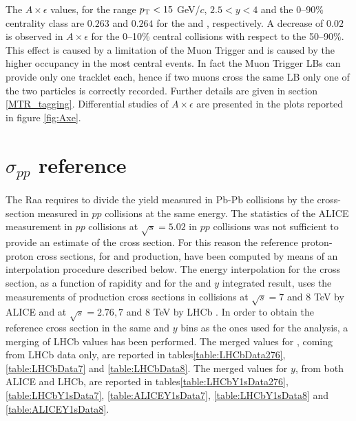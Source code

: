 The $A\times\epsilon$ values, for the range $p_{\rm T} < 15$ GeV/$c$, $2.5 < y < 4$ and the 0--90\% centrality class are $0.263$ and $0.264$ for the \upsis and \upsiss, respectively. 
A decrease of $0.02$ is observed in  $A\times\epsilon$ for the 0--10\% central collisions with respect to the 50--90\%. This effect is caused by a limitation of the Muon Trigger and is caused by the higher occupancy in the most central events.
In fact the Muon Trigger LBs can provide only one tracklet each, hence if two muons cross the same LB only one of the two particles is correctly recorded.
Further details are given in section \ref{MTR_tagging}.
Differential studies of $A\times\epsilon$ are presented in the plots reported in figure \ref{fig:Axe}.

\section{$\sigma_{pp}$ reference}
\label{sec:ppxsection}
The Raa requires to divide the yield measured in Pb-Pb collisions by the cross-section measured in $pp$ collisions at the same energy.
The statistics of the ALICE measurement in $pp$ collisions at $\sqrt{s}=5.02$ in $pp$ collisions was not sufficient to provide an estimate of the \upsi cross section.
For this reason the reference proton-proton cross sections, for \upsis and \upsiss production, have been computed by means of an interpolation procedure described below.
The energy interpolation for the \upsi cross section, as a function of rapidity and for the \pt and $y$ integrated result, uses the measurements of \upsi production cross sections in \pp collisions at $\sqrt{s}=7$ and $8$ \rm{TeV} by ALICE \cite{Abelev:2014qha,Adam:2015rta} and at $\sqrt{s}=2.76, 7$ and $8$ \rm{TeV} by LHCb \cite{Aaij:2014nwa,Aaij:2015awa}. 
In order to obtain the reference cross section in the same \pt and $y$ bins as the ones used for the analysis, a merging of LHCb values has been performed.
The merged values for \pt, coming from LHCb data only, are reported in tables\ref{table:LHCbData276}, \ref{table:LHCbData7} and \ref{table:LHCbData8}.
The merged values for $y$, from both ALICE and LHCb, are reported in tables\ref{table:LHCbY1sData276}, \ref{table:LHCbY1sData7}, \ref{table:ALICEY1sData7}, \ref{table:LHCbY1sData8} and \ref{table:ALICEY1sData8}.

